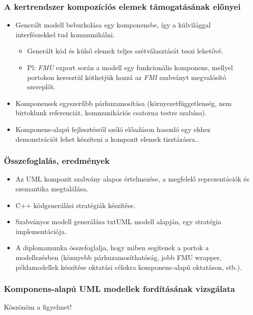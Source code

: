 \documentclass[11pt]{beamer}
\begin{document}
\begin{frame}
	\frametitle{A kertrendszer kompozíciós elemek támogatásának előnyei}
	
	\begin{itemize}
	\item Generált modell beburkolása egy komponensbe, így a külvilággal interfészekkel tud kommunikálni.
	\begin{itemize}
	\item Generált kód és külső elemek teljes szétválasztását teszi lehetővé.
	\item Pl: \textit{FMU} export során a modell egy funkcionális komponens, mellyel portokon keresztül köthetjük hozzá az \textit{FMI} szabványt megvalósító szereplőt.
	\end{itemize}
	\item Komponensek egyszerűbb párhuzamosítása (környezetfüggetlenség, nem birtoklunk referenciát, kommunikációs csatorna testre szabása).
	\item Komponens-alapú fejlesztésről szóló előadáson hasonló egy ehhez demonstrációt lehet készíteni a kompozit elemek tisztázásra..
	\end{itemize}

\end{frame}

\begin{frame}
	\frametitle{Összefoglalás, eredmények}
	\begin{itemize}
	\item Az UML kompozit szabvány alapos értelmezése, a megfelelő reprezentációk és szemantika megtalálása.
	\item C++ kódgenerálási stratégiák készítése.
	\item Szabványos modell generálása txtUML modell alapján, egy stratégia implementációja.
	\item A diplomamunka összefoglalja, hogy miben segítenek a portok a modellezésben (könnyebb párhuzamosíthatóság, jobb FMU wrapper, példamodellek készítése oktatási célokra komponens-alapú oktatáson, stb.).
	\end{itemize}
\end{frame}

\begin{frame}
	\frametitle{Komponens-alapú UML modellek fordításának vizsgálata}
	\begin{center}
		\Large{Köszönöm a figyelmet!}
	\end{center}
\end{frame}
\end{document}
